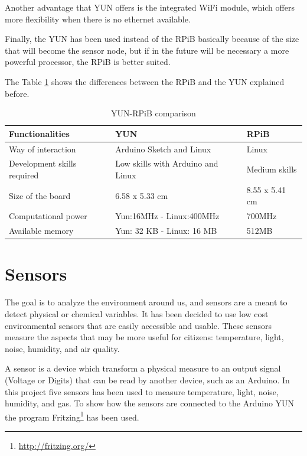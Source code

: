 \documentclass[12pt, a4paper,twoside]{tesi_upf}
\begin{document}
    Another advantage that YUN offers is the integrated WiFi module, which offers more flexibility when there is no ethernet available.
    
    Finally, the YUN has been used instead of the RPiB basically because of the size that will become the sensor node, but if in the future will be necessary a more powerful processor, the RPiB is better suited.
    
    The Table \ref{tab:YUN-RPiBcomparisonfig:sensorboards} shows the differences between the RPiB and the YUN explained before.
    
    \begin{table}
    	\centering
		  \begin{tabular}{ | l | p{6cm} | p{3cm} |}
				\hline
				{\bf Functionalities} & {\bf YUN} & {\bf RPiB} \\ \hline
				Way of interaction & Arduino Sketch and Linux & Linux \\ \hline
				Development skills required & Low skills with Arduino and Linux & Medium skills \\ \hline
				Size of the board & 6.58 x 5.33 cm & 8.55 x 5.41 cm \\ \hline
				Computational power & Yun:16MHz - Linux:400MHz & 700MHz \\ \hline
				Available memory & Yun: 32 KB - Linux: 16 MB & 512MB \\ \hline
		  \end{tabular}
      \caption{YUN-RPiB comparison}
      \label{tab:YUN-RPiBcomparisonfig:sensorboards}
		\end{table}

  \section{Sensors}
    The goal is to analyze the environment around us, and sensors are a meant to detect physical or chemical variables. It has been decided to use low cost environmental sensors that are easily accessible and usable. 
    These sensors measure the aspects that may be more useful for citizens: temperature, light, noise, humidity, and air quality.
    
    A sensor is a device which transform a physical measure to an output signal (Voltage or Digits) that can be read by another device, such as an Arduino.
    In this project five sensors has been used to measure temperature, light, noise, humidity, and gas.
    To show how the sensors are connected to the Arduino YUN the program Fritzing\footnote{\url{http://fritzing.org/}} has been used.
    
\end{document}

